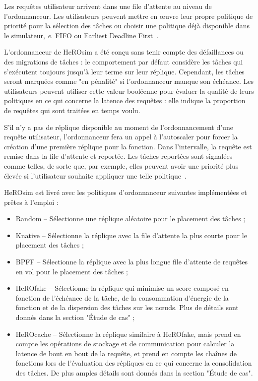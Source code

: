 Les requêtes utilisateur arrivent dans une file d'attente au niveau de l'ordonnanceur. Les utilisateurs peuvent mettre en œuvre leur propre politique de priorité pour la sélection des tâches ou choisir une politique déjà disponible dans le simulateur, \textit{e.} FIFO ou Earliest Deadline First~\cite{herofake}.

L'ordonnanceur de HeROsim a été conçu sans tenir compte des défaillances ou des migrations de tâches : le comportement par défaut considère les tâches qui s'exécutent toujours jusqu'à leur terme sur leur réplique. Cependant, les tâches seront marquées comme "en pénalité" si l'ordonnanceur manque son échéance. Les utilisateurs peuvent utiliser cette valeur booléenne pour évaluer la qualité de leurs politiques en ce qui concerne la latence des requêtes : elle indique la proportion de requêtes qui sont traitées en temps voulu. 

S'il n'y a pas de réplique disponible au moment de l'ordonnancement d'une requête utilisateur, l'ordonnanceur fera un appel à l'autoscaler pour forcer la création d'une première réplique pour la fonction. Dans l'intervalle, la requête est remise dans la file d'attente et reportée. Les tâches reportées sont signalées comme telles, de sorte que, par exemple, elles peuvent avoir une priorité plus élevée si l'utilisateur souhaite appliquer une telle politique~\cite{herocache}.

HeROsim est livré avec les politiques d'ordonnanceur suivantes implémentées et prêtes à l'emploi :

\begin{itemize}
    \item Random -- Sélectionne une réplique aléatoire pour le placement des tâches ;
    \item Knative -- Sélectionne la réplique avec la file d'attente la plus courte pour le placement des tâches ;
    \item BPFF -- Sélectionne la réplique avec la plus longue file d'attente de requêtes en vol pour le placement des tâches ;
    \item HeROfake -- Sélectionne la réplique qui minimise un score composé en fonction de l'échéance de la tâche, de la consommation d'énergie de la fonction et de la dispersion des tâches sur les nœuds. Plus de détails sont donnés dans la section "Étude de cas" ;
    \item HeROcache -- Sélectionne la réplique similaire à HeROfake, mais prend en compte les opérations de stockage et de communication pour calculer la latence de bout en bout de la requête, et prend en compte les chaînes de fonctions lors de l'évaluation des répliques en ce qui concerne la consolidation des tâches. De plus amples détails sont donnés dans la section "Étude de cas".
\end{itemize}


